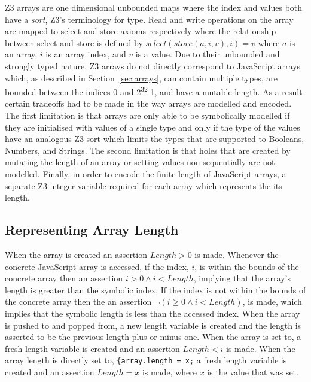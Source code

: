 \documentclass[]{final_report}
\begin{document}
Z3 arrays are one dimensional unbounded maps where the index and values both have a \textit{sort}, Z3's terminology for type. Read and write operations on the array are mapped to select and store axioms respectively where the relationship between select and store is defined by $select(store(a, i, v), i) = v$ where $a$ is an array, $i$ is an array index, and $v$ is a value. Due to their unbounded and strongly typed nature, Z3 arrays do not directly correspond to JavaScript arrays which, as described in Section~\ref{sec:arrays}, can contain multiple types, are bounded between the indices 0 and 2\textsuperscript{32}-1, and have a mutable length. As a result certain tradeoffs had to be made in the way arrays are modelled and encoded. The first limitation is that arrays are only able to be symbolically modelled if they are initialised with values of a single type and only if the type of the values have an analogous Z3 sort which limits the types that are supported to Booleans, Numbers, and Strings. The second limitation is that holes that are created by mutating the length of an array or setting values non-sequentially are not modelled. Finally, in order to encode the finite length of JavaScript arrays, a separate Z3 integer variable required for each array which represents the its length. 

\subsection{Representing Array Length}
When the array is created an assertion $Length > 0$ is made. Whenever the concrete JavaScript array is accessed, if the index, $i$, is within the bounds of the concrete array then an assertion $i > 0 \land i < Length$, implying that the array's length is greater than the symbolic index. If the index is not within the bounds of the concrete array then the an assertion $\lnot{(i \geq 0 \land i < Length)}$, is made, which implies that the symbolic length is less than the accessed index. When the array is pushed to and popped from, a new length variable is created and the length is asserted to be the previous length plus or minus one. When the array is set to, a fresh length variable is created and an assertion $Length < i$ is made. When the array length is directly set to, \lstinline|{array.length = x;| a fresh length variable is created and an assertion $Length = x$ is made, where $x$ is the value that was set.
\end{document}
